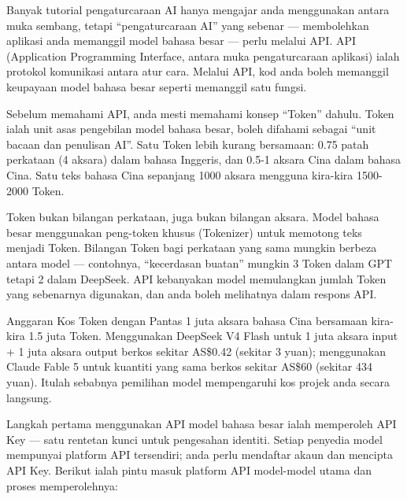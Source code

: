 
Banyak tutorial pengaturcaraan AI hanya mengajar anda menggunakan antara muka sembang, tetapi “pengaturcaraan AI” yang sebenar — membolehkan aplikasi anda memanggil model bahasa besar — perlu melalui API. API (Application Programming Interface, antara muka pengaturcaraan aplikasi) ialah protokol komunikasi antara atur cara. Melalui API, kod anda boleh memanggil keupayaan model bahasa besar seperti memanggil satu fungsi.


Sebelum memahami API, anda mesti memahami konsep “Token” dahulu. Token ialah unit asas pengebilan model bahasa besar, boleh difahami sebagai “unit bacaan dan penulisan AI”. Satu Token lebih kurang bersamaan: 0.75 patah perkataan (4 aksara) dalam bahasa Inggeris, dan 0.5-1 aksara Cina dalam bahasa Cina. Satu teks bahasa Cina sepanjang 1000 aksara mengguna kira-kira 1500-2000 Token.

Token bukan bilangan perkataan, juga bukan bilangan aksara. Model bahasa besar menggunakan peng-token khusus (Tokenizer) untuk memotong teks menjadi Token. Bilangan Token bagi perkataan yang sama mungkin berbeza antara model — contohnya, “kecerdasan buatan” mungkin 3 Token dalam GPT tetapi 2 dalam DeepSeek. API kebanyakan model memulangkan jumlah Token yang sebenarnya digunakan, dan anda boleh melihatnya dalam respons API.

\begin{tcbinfo}{Anggaran Kos Token dengan Pantas}
1 juta aksara bahasa Cina bersamaan kira-kira 1.5 juta Token. Menggunakan DeepSeek V4 Flash untuk 1 juta aksara input + 1 juta aksara output berkos sekitar AS\$0.42 (sekitar 3 yuan); menggunakan Claude Fable 5 untuk kuantiti yang sama berkos sekitar AS\$60 (sekitar 434 yuan). Itulah sebabnya pemilihan model mempengaruhi kos projek anda secara langsung.

\end{tcbinfo}


Langkah pertama menggunakan API model bahasa besar ialah memperoleh API Key — satu rentetan kunci untuk pengesahan identiti. Setiap penyedia model mempunyai platform API tersendiri; anda perlu mendaftar akaun dan mencipta API Key. Berikut ialah pintu masuk platform API model-model utama dan proses memperolehnya:

